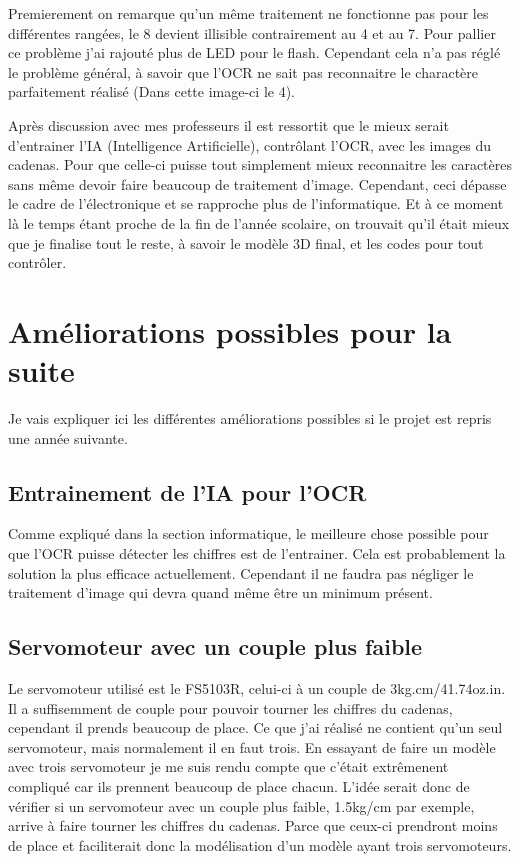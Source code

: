 \documentclass[twoside]{article}
\begin{document}
\begin{multicols}{2}
Premierement on remarque qu'un même traitement ne fonctionne pas pour les différentes rangées, le 8 devient illisible contrairement au 4 et au 7. Pour pallier ce problème j'ai rajouté plus de LED pour le flash. Cependant cela n'a pas réglé le problème général, à savoir que l'OCR ne sait pas reconnaitre le charactère parfaitement réalisé (Dans cette image-ci le 4).

Après discussion avec mes professeurs il est ressortit que le mieux serait d'entrainer l'IA (Intelligence Artificielle), contrôlant l'OCR, avec les images du cadenas. Pour que celle-ci puisse tout simplement mieux reconnaitre les caractères sans même devoir faire beaucoup de traitement d'image. Cependant, ceci dépasse le cadre de l'électronique et se rapproche plus de l'informatique. Et à ce moment là le temps étant proche de la fin de l'année scolaire, on trouvait qu'il était mieux que je finalise tout le reste, à savoir le modèle 3D final, et les codes pour tout contrôler.

\section{Améliorations possibles pour la suite}
Je vais expliquer ici les différentes améliorations possibles si le projet est repris une année suivante.

\subsection{Entrainement de l'IA pour l'OCR}

Comme expliqué dans la section informatique, le meilleure chose possible pour que l'OCR puisse détecter les chiffres est de l'entrainer. Cela est probablement la solution la plus efficace actuellement. Cependant il ne faudra pas négliger le traitement d'image qui devra quand même être un minimum présent.

\subsection{Servomoteur avec un couple plus faible}

Le servomoteur utilisé est le FS5103R, celui-ci à un couple de 3kg.cm/41.74oz.in. Il a suffisemment de couple pour pouvoir tourner les chiffres du cadenas, cependant il prends beaucoup de place. Ce que j'ai réalisé ne contient qu'un seul servomoteur, mais normalement il en faut trois. En essayant de faire un modèle avec trois servomoteur je me suis rendu compte que c'était extrêmenent compliqué car ils prennent beaucoup de place chacun. L'idée serait donc de vérifier si un servomoteur avec un couple plus faible, 1.5kg/cm par exemple, arrive à faire tourner les chiffres du cadenas. Parce que ceux-ci prendront moins de place et faciliterait donc la modélisation d'un modèle ayant trois servomoteurs.


\end{multicols}
\end{document}
